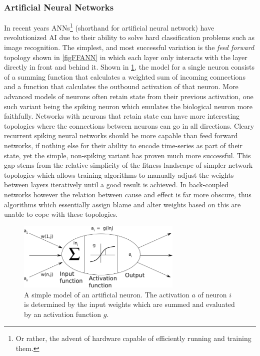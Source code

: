 \subsubsection{Artificial Neural Networks}
In recent years ANNs\footnote{Or rather, the advent of hardware capable of
  efficiently running and training them.} (shorthand for artificial neural
network) have revolutionized AI due to their ability to solve hard
classification problems such as image recognition.
The simplest, and most successful variation is the \emph{feed forward} topology
shown in \ref{figFFANN} in which each layer only interacts with the layer
directly in front and behind it.
Shown in \ref{figNeuronModel}, the model for a single neuron consists of a
summing function that calculates a weighted sum of incoming connections and a
function that calculates the outbound activation of that neuron.
More advanced models of neurons often retain state from their previous
activation, one such variant being the spiking neuron which emulates the
biological neuron more faithfully.
Networks with neurons that retain state can have more interesting topologies
where the connections between neurons can go in all directions.
Cleary recurrent spiking neural networks should be more capable than feed
forward networks, if nothing else for their ability to encode time-series as
part of their state, yet the simple, non-spiking variant has proven much more
successful.
This gap stems from the relative simplicity of the fitness landscape of simpler
network topologies which allows training algorithms to manually adjust the
weights between layers iteratively until a good result is achieved.
In back-coupled networks however the relation between cause and effect is far
more obscure, thus algorithms which essentially assign blame and alter weights
based on this are unable to cope with these topologies.
\begin{figure}[h!]
  \centering
  \includegraphics[width=0.7\textwidth]{fig/ArtificialNeuron.png}
  \caption{
    A simple model of an artificial neuron.
    The activation $a$ of neuron $i$ is determined by the input weights which
    are summed and evaluated by an activation function $g$.
  }
  \label{figNeuronModel}
\end{figure}
